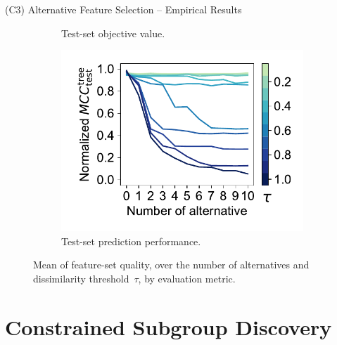 \documentclass[en, navbarinline, handout]{sdqbeamer}
\begin{document}
\begin{frame}[t]{(C3) Alternative Feature Selection -- Empirical Results}
\begin{figure}
\begin{subfigure}[t]{0.32\textwidth}
			\caption{Test-set objective value.}
		\end{subfigure}
		\hfill
		\begin{subfigure}[t]{0.32\textwidth}
			\centering
			\includegraphics[width=\textwidth, trim={15 15 10 15}, clip]{plots/afs-impact-num-alternatives-tau-decision-tree-test-mcc-max-fillna.pdf}
			\caption{Test-set prediction performance.}
		\end{subfigure}
		\caption*{
			\normalsize Mean of feature-set quality, over the number of alternatives and dissimilarity threshold~$\tau$, by evaluation metric. %
		}
	\end{figure}
\end{frame}

\section{Constrained Subgroup Discovery}
\end{document}
